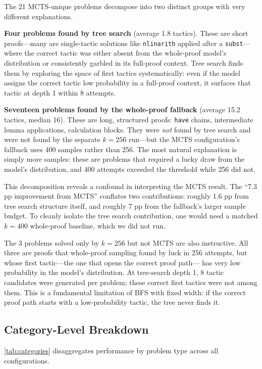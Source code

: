 \documentclass[openany, amssymb, psamsfonts]{amsart}
\theoremstyle{definition}
\numberwithin{equation}{section}
\begin{document}
The 21 MCTS-unique problems decompose into two distinct groups with very
different explanations.

\textbf{Four problems found by tree search} (average 1.8 tactics).
These are short proofs---many are single-tactic solutions like
\texttt{nlinarith} applied after a \texttt{subst}---where the correct
tactic was either absent from the whole-proof model's distribution or
consistently garbled in its full-proof context.
Tree search finds them by exploring the space of first tactics
systematically: even if the model assigns the correct tactic low probability
in a full-proof context, it surfaces that tactic at depth 1 within 8 attempts.

\textbf{Seventeen problems found by the whole-proof fallback} (average 15.2 tactics, median 16).
These are long, structured proofs: \texttt{have} chains, intermediate
lemma applications, calculation blocks.
They were \emph{not} found by tree search and were not found by the
separate $k=256$ run---but the MCTS configuration's fallback uses 400
samples rather than 256.
The most natural explanation is simply more samples: these are problems
that required a lucky draw from the model's distribution, and 400
attempts exceeded the threshold while 256 did not.

This decomposition reveals a confound in interpreting the MCTS result.
The ``7.3 pp improvement from MCTS'' conflates two contributions:
roughly 1.6 pp from tree search structure itself, and roughly 7 pp from
the fallback's larger sample budget.
To cleanly isolate the tree search contribution, one would need a
matched $k=400$ whole-proof baseline, which we did not run.

The 3 problems solved only by $k=256$ but not MCTS are also instructive.
All three are proofs that whole-proof sampling found by luck in 256 attempts,
but whose first tactic---the one that opens the correct proof path---
has very low probability in the model's distribution.
At tree-search depth 1, 8 tactic candidates were generated per problem;
these correct first tactics were not among them.
This is a fundamental limitation of BFS with fixed width: if the correct
proof path starts with a low-probability tactic, the tree never finds it.

\subsection{Category-Level Breakdown}
\label{sec:categories}

\autoref{tab:categories} disaggregates performance by problem type across
all configurations.
\end{document}
